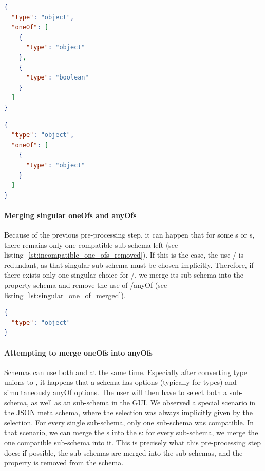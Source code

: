 \begin{lstlisting}[language=json, firstnumber=1, caption=
    {Simple JSON schema with incompatible oneOf option}, captionpos=b, label={lst:incompatible_one_ofs}]
{
  "type": "object",
  "oneOf": [
    {
      "type": "object"
    },
    {
      "type": "boolean"
    }
  ]
}
\end{lstlisting}


\begin{lstlisting}[language=json, firstnumber=1, caption=
    {Simple JSON schema with the incompatible oneOf option removed}, captionpos=b, label={lst:incompatible_one_ofs_removed}]
{
  "type": "object",
  "oneOf": [
    {
      "type": "object"
    }
  ]
}
\end{lstlisting}


\paragraph{Merging singular oneOfs and anyOfs}
Because of the previous pre-processing step, it can happen that for some s or s, there remains
only one compatible sub-schema left (see listing~\ref{lst:incompatible_one_ofs_removed}).
If this is the case, the use / is redundant, as that singular sub-schema must be chosen implicitly.
Therefore, if there exists only one singular choice for /, we merge its sub-schema into the property schema
and remove the use of /anyOf (see listing~\ref{lst:singular_one_of_merged}).

\begin{lstlisting}[language=json, firstnumber=1, caption=
    {Simple JSON schema with singular oneOf merged into property schema}, captionpos=b, label={lst:singular_one_of_merged}]
{
  "type": "object"
}
\end{lstlisting}


\paragraph{Attempting to merge oneOfs into anyOfs}
Schemas can use both  and  at the same time.
Especially after converting type unions to , it happens that a schema has  options (typically for types) and simultaneously anyOf options.
The user will then have to select both a  sub-schema, as well as an  sub-schema in the GUI\@.
We observed a special scenario in the JSON meta schema, where the  selection was always implicitly given by the  selection.
For every single  sub-schema, only one  sub-schema was compatible.
In that scenario, we can merge the s into the s: for every  sub-schema, we merge the one compatible  sub-schema into it.
This is precisely what this pre-processing step does: if possible, the  sub-schemas are merged into the  sub-schemas, and the  property is removed from the schema.


